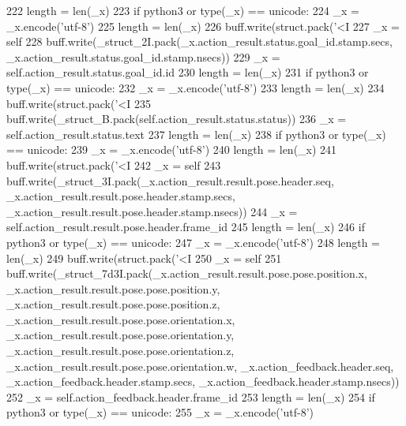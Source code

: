 \begin{DoxyCode}
{{{222       length = len(\_x)
223       \textcolor{keywordflow}{if} python3 \textcolor{keywordflow}{or} type(\_x) == unicode:
224         \_x = \_x.encode(\textcolor{stringliteral}{'utf-8'})
225         length = len(\_x)
226       buff.write(struct.pack(\textcolor{stringliteral}{'<I%
227       \_x = self
228       buff.write(\_struct\_2I.pack(\_x.action\_result.status.goal\_id.stamp.secs, 
      \_x.action\_result.status.goal\_id.stamp.nsecs))
229       \_x = self.action\_result.status.goal\_id.id
230       length = len(\_x)
231       \textcolor{keywordflow}{if} python3 \textcolor{keywordflow}{or} type(\_x) == unicode:
232         \_x = \_x.encode(\textcolor{stringliteral}{'utf-8'})
233         length = len(\_x)
234       buff.write(struct.pack(\textcolor{stringliteral}{'<I%
235       buff.write(\_struct\_B.pack(self.action\_result.status.status))
236       \_x = self.action\_result.status.text
237       length = len(\_x)
238       \textcolor{keywordflow}{if} python3 \textcolor{keywordflow}{or} type(\_x) == unicode:
239         \_x = \_x.encode(\textcolor{stringliteral}{'utf-8'})
240         length = len(\_x)
241       buff.write(struct.pack(\textcolor{stringliteral}{'<I%
242       \_x = self
243       buff.write(\_struct\_3I.pack(\_x.action\_result.result.pose.header.seq, 
      \_x.action\_result.result.pose.header.stamp.secs, \_x.action\_result.result.pose.header.stamp.nsecs))
244       \_x = self.action\_result.result.pose.header.frame\_id
245       length = len(\_x)
246       \textcolor{keywordflow}{if} python3 \textcolor{keywordflow}{or} type(\_x) == unicode:
247         \_x = \_x.encode(\textcolor{stringliteral}{'utf-8'})
248         length = len(\_x)
249       buff.write(struct.pack(\textcolor{stringliteral}{'<I%
250       \_x = self
251       buff.write(\_struct\_7d3I.pack(\_x.action\_result.result.pose.pose.position.x, 
      \_x.action\_result.result.pose.pose.position.y, \_x.action\_result.result.pose.pose.position.z, 
      \_x.action\_result.result.pose.pose.orientation.x, \_x.action\_result.result.pose.pose.orientation.y, \_x.action\_result.result.pose.pose.orientation.z, 
      \_x.action\_result.result.pose.pose.orientation.w, \_x.action\_feedback.header.seq, 
      \_x.action\_feedback.header.stamp.secs, \_x.action\_feedback.header.stamp.nsecs))
252       \_x = self.action\_feedback.header.frame\_id
253       length = len(\_x)
254       \textcolor{keywordflow}{if} python3 \textcolor{keywordflow}{or} type(\_x) == unicode:
255         \_x = \_x.encode(\textcolor{stringliteral}{'utf-8'})
}}}}}}}
\end{DoxyCode}
